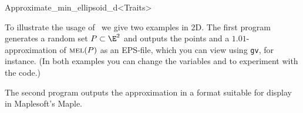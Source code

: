 \begin{ccRefClass}{Approximate_min_ellipsoid_d<Traits>}

\ccExample
{}

To illustrate the usage of \ccRefName\ we give two examples in 2D. The
first program generates a random set $P\subset\E^2$ and outputs the
points and a $1.01$-approximation of $\mathop{{\textsc{mel}}}\nolimits(P)$ as an EPS-file, which
you can view using {\tt gv}, for instance.  (In both examples you can
change the variables  and  to experiment with the code.)


The second program outputs the approximation in a format suitable
for display in Maplesoft's Maple.



\ccRestoreThreeColumns

\end{ccRefClass}

